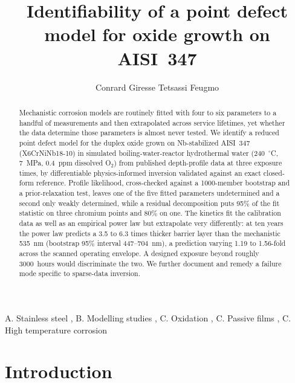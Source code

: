 \documentclass[preprint,12pt]{elsarticle}
\begin{document}
\begin{frontmatter}

\title{Identifiability of a point defect model for oxide growth on AISI~347}

\author[uw]{Conrard Giresse Tetsassi Feugmo}

\address[uw]{Department of Chemistry and Department of Physics \& Astronomy,
             University of Waterloo, 200 University Avenue West,
             Waterloo, ON N2L 3G1, Canada}

\begin{abstract}
Mechanistic corrosion models are routinely fitted with four to six
parameters to a handful of measurements and then extrapolated across
service lifetimes, yet whether the data determine those parameters is
almost never tested. We identify a reduced point defect model for the
duplex oxide grown on Nb-stabilized AISI~347 (X6CrNiNb18-10) in
simulated boiling-water-reactor hydrothermal water
(240~$^\circ$C, 7~MPa, 0.4~ppm dissolved O$_2$) from published
depth-profile data at three exposure times, by differentiable
physics-informed inversion validated against an exact closed-form
reference. Profile likelihood, cross-checked against a 1000-member
bootstrap and a prior-relaxation test, leaves one of the five fitted
parameters undetermined and a second only weakly determined, while a
residual decomposition puts 95\% of the fit statistic on three chromium
points and 80\% on one. The kinetics fit the calibration data as well as
an empirical power law but extrapolate very differently: at ten years
the power law predicts a 3.5 to 6.3 times thicker barrier layer than the
mechanistic 535~nm (bootstrap 95\% interval 447--704~nm), a prediction
varying 1.19 to 1.56-fold across the scanned operating envelope. A
designed exposure beyond roughly 3000~hours would discriminate the two.
We further document and remedy a failure mode specific to sparse-data
inversion.
\end{abstract}

\begin{keyword}
A. Stainless steel \sep
B. Modelling studies \sep
C. Oxidation \sep
C. Passive films \sep
C. High temperature corrosion
\end{keyword}

\end{frontmatter}

\section{Introduction}\label{sec:intro}
\end{document}
